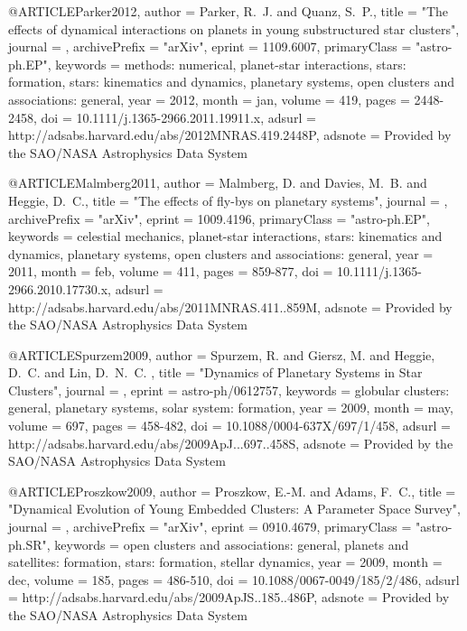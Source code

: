 \documentclass[twocolumn,tighten]{aastex63}
\begin{document}
{@ARTICLE{Parker2012,
   author = {{Parker}, R.~J. and {Quanz}, S.~P.},
    title = "{The effects of dynamical interactions on planets in young substructured star clusters}",
  journal = {\mnras},
archivePrefix = "arXiv",
   eprint = {1109.6007},
 primaryClass = "astro-ph.EP",
 keywords = {methods: numerical, planet-star interactions, stars: formation, stars: kinematics and dynamics, planetary systems, open clusters and associations: general},
     year = 2012,
    month = jan,
   volume = 419,
    pages = {2448-2458},
      doi = {10.1111/j.1365-2966.2011.19911.x},
   adsurl = {http://adsabs.harvard.edu/abs/2012MNRAS.419.2448P},
  adsnote = {Provided by the SAO/NASA Astrophysics Data System}
}

@ARTICLE{Malmberg2011,
   author = {{Malmberg}, D. and {Davies}, M.~B. and {Heggie}, D.~C.},
    title = "{The effects of fly-bys on planetary systems}",
  journal = {\mnras},
archivePrefix = "arXiv",
   eprint = {1009.4196},
 primaryClass = "astro-ph.EP",
 keywords = {celestial mechanics, planet-star interactions, stars: kinematics and dynamics, planetary systems, open clusters and associations: general},
     year = 2011,
    month = feb,
   volume = 411,
    pages = {859-877},
      doi = {10.1111/j.1365-2966.2010.17730.x},
   adsurl = {http://adsabs.harvard.edu/abs/2011MNRAS.411..859M},
  adsnote = {Provided by the SAO/NASA Astrophysics Data System}
}

@ARTICLE{Spurzem2009,
   author = {{Spurzem}, R. and {Giersz}, M. and {Heggie}, D.~C. and {Lin}, D.~N.~C.
	},
    title = "{Dynamics of Planetary Systems in Star Clusters}",
  journal = {\apj},
   eprint = {astro-ph/0612757},
 keywords = {globular clusters: general, planetary systems, solar system: formation},
     year = 2009,
    month = may,
   volume = 697,
    pages = {458-482},
      doi = {10.1088/0004-637X/697/1/458},
   adsurl = {http://adsabs.harvard.edu/abs/2009ApJ...697..458S},
  adsnote = {Provided by the SAO/NASA Astrophysics Data System}
}


@ARTICLE{Proszkow2009,
   author = {{Proszkow}, E.-M. and {Adams}, F.~C.},
    title = "{Dynamical Evolution of Young Embedded Clusters: A Parameter Space Survey}",
  journal = {\apjs},
archivePrefix = "arXiv",
   eprint = {0910.4679},
 primaryClass = "astro-ph.SR",
 keywords = {open clusters and associations: general, planets and satellites: formation, stars: formation, stellar dynamics},
     year = 2009,
    month = dec,
   volume = 185,
    pages = {486-510},
      doi = {10.1088/0067-0049/185/2/486},
   adsurl = {http://adsabs.harvard.edu/abs/2009ApJS..185..486P},
  adsnote = {Provided by the SAO/NASA Astrophysics Data System}
}

}
\end{document}

